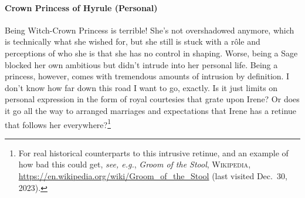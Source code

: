   \paragraph{Crown Princess of Hyrule (Personal)} Being Witch-Crown Prin\-cess is terrible! She's not overshadowed anymore, which is technically what she wished for, but she still is stuck with a r\^ole and perceptions of who she is that she has no control in shaping. Worse, being a Sage blocked her own ambitious but didn't intrude into her personal life. Being a princess, however, comes with tremendous amounts of intrusion by definition. I don't know how far down this road I want to go, exactly. Is it just limits on personal expression in the form of royal courtesies that grate upon Irene? Or does it go all the way to arranged marriages and expectations that Irene has a retinue that follows her everywhere?\footnote{For real historical counterparts to this intrusive retinue, and an example of how bad this could get, \emph{see, e.g.}, \textit{Groom of the Stool}, \textsc{Wikipedia}, \url{https://en.wikipedia.org/wiki/Groom_of_the_Stool} (last visited Dec.~30, 2023).}

